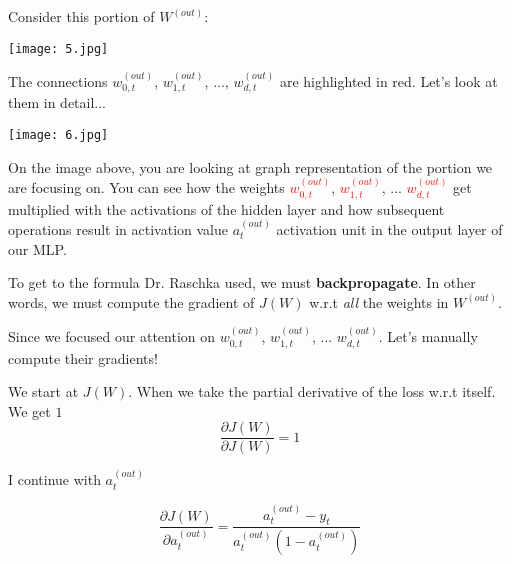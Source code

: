 \documentclass[../main.tex]{subfiles}
\begin{document}
Consider this portion of $W^{(out)}$: 
\begin{center}
    \texttt{[image: 5.jpg]}
\end{center}

\vspace{5mm} %

The connections $w_{0,t}^{(out)}$, $w_{1,t}^{(out)}$, ..., $w_{d,t}^{(out)}$ are highlighted
in red. Let's look at them in detail...

\vspace{5mm} %

\begin{center}
    \texttt{[image: 6.jpg]}
\end{center}

\vspace{5mm} %

On the image above, you are looking at graph representation of the portion we are focusing on. You can see
how the weights \textcolor{red}{$w_{0,t}^{(out)}$}, \textcolor{red}{$w_{1,t}^{(out)}$}, ... 
\textcolor{red}{$w_{d,t}^{(out)}$} get multiplied with the activations of the hidden layer 
and how subsequent operations result in activation value $a_t^{(out)}$ activation unit in the
output layer of our MLP.

\vspace{5mm} %

To get to the formula Dr. Raschka used, we must \textbf{backpropagate}. In other words,
we must compute the gradient of $J(W)$ w.r.t \emph{all} the weights in $W^{(out)}$. 

\vspace{5mm} %

Since we focused our attention on $w_{0,t}^{(out)}$, $w_{1,t}^{(out)}$, ... $w_{d,t}^{(out)}$.
Let's manually compute their gradients!

\vspace{5mm} %

We start at $J(W)$. When we take the partial derivative of the loss w.r.t itself. We get $1$
\[\frac{\partial J(W)}{\partial J(W)} = 1 \]

\vspace{5mm} %

I continue with $a_{t}^{(out)}$

\[
    \frac{\partial J(W)}{\partial a_{t}^{(out)}} =
    \frac{a_{t}^{(out)} - y_{t}}{a_{t}^{(out)}(1 - a_{t}^{(out)})}
\]
\end{document}
